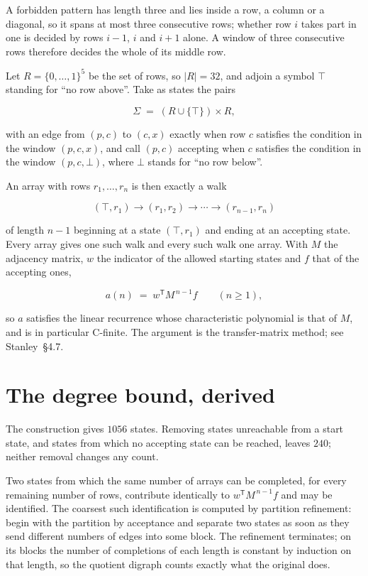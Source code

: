 \documentclass[11pt]{article}
\theoremstyle{definition}
\begin{document}
A forbidden pattern has length three and lies inside a row, a column or a diagonal, so it spans at most three consecutive rows; whether row $i$ takes part in one is decided by rows $i-1$, $i$ and $i+1$ alone. A window of three consecutive rows therefore decides the whole of its middle row.

Let $R = \{0,\dots,1\}^{5}$ be the set of rows, so $|R| = 32$, and adjoin a symbol $\top$ standing for ``no row above''. Take as states the pairs

\[\Sigma \;=\; (R \cup \{\top\}) \times R,\]

with an edge from $(p,c)$ to $(c,x)$ exactly when row $c$ satisfies the condition in the window $(p,c,x)$, and call $(p,c)$ accepting when $c$ satisfies the condition in the window $(p,c,\bot)$, where $\bot$ stands for ``no row below''.

An array with rows $r_1,\dots,r_n$ is then exactly a walk

\[(\top,r_1) \to (r_1,r_2) \to \cdots \to (r_{n-1},r_n)\]

of length $n-1$ beginning at a state $(\top,r_1)$ and ending at an accepting state. Every array gives one such walk and every such walk one array. With $M$ the adjacency matrix, $w$ the indicator of the allowed starting states and $f$ that of the accepting ones,

\[a(n) \;=\; w^{\mathsf T} M^{\,n-1} f \qquad (n \ge 1),\]

so $a$ satisfies the linear recurrence whose characteristic polynomial is that of $M$, and is in particular C-finite. The argument is the transfer-matrix method; see Stanley~\S4.7.

\section{The degree bound, derived}

The construction gives $1056$ states. Removing states unreachable from a start state, and states from which no accepting state can be reached, leaves $240$; neither removal changes any count.

Two states from which the same number of arrays can be completed, for every remaining number of rows, contribute identically to $w^{\mathsf T}M^{\,n-1}f$ and may be identified. The coarsest such identification is computed by partition refinement: begin with the partition by acceptance and separate two states as soon as they send different numbers of edges into some block. The refinement terminates; on its blocks the number of completions of each length is constant by induction on that length, so the quotient digraph counts exactly what the original does.
\end{document}
